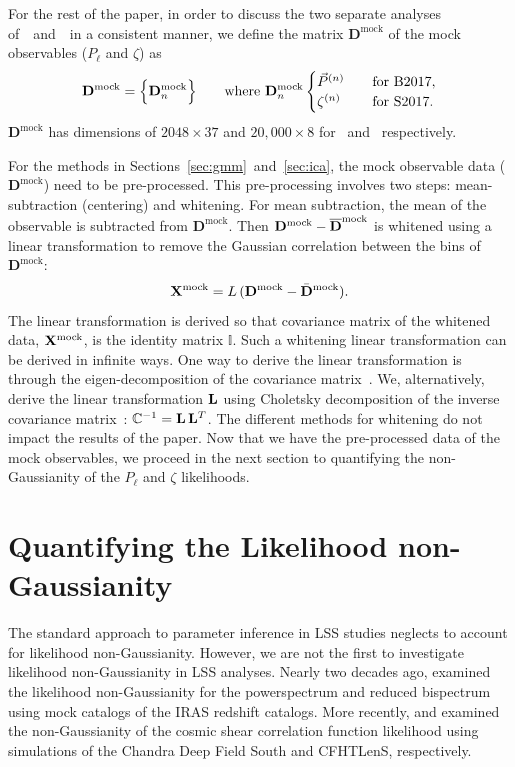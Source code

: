 \documentclass[12pt, letterpaper, preprint]{aastex}
\newcommand{\beq}{\begin{equation}}
\newcommand{\eeq}{\end{equation}}
\newcommand{\Dmock}{\mathbf{D}^\mathrm{mock}}
\newcommand{\Xmock}{{\bf X}^\mathrm{mock}}
\newcommand{\Beut}{\citetalias{beutler2017}}
\newcommand{\Sinh}{\citetalias{sinha2017}}
\begin{document}
For the rest of the paper, in order to discuss the two separate 
analyses of~\Beut~and~\Sinh~in a consistent manner, we define the matrix 
$\Dmock$ of the mock observables ($P_\ell$ and $\zeta$) as 
\beq
\Dmock = \Big\{{\bf D}^\mathrm{mock}_n \Big\} \quad\quad \mathrm{where}\,\,\Dmock_n
\begin{cases}
    \vec{P}^{(n)} &\quad\mathrm{for}\,\, \mathrm{B}2017,\\ 
    \zeta^{(n)} &\quad\mathrm{for}\,\, \mathrm{S}2017.
\end{cases} 
\eeq
$\Dmock$ has dimensions of $2048 \times 37$ and $20,000\times8$ 
for \Beut~and \Sinh~respectively. 

For the methods in Sections~\ref{sec:gmm}~and~\ref{sec:ica}, the mock 
observable data ($\Dmock$) need to be pre-processed. This pre-processing
involves two steps: mean-subtraction (centering) and whitening. For mean subtraction, 
the mean of the observable is subtracted from $\Dmock$. Then 
$\Dmock - \overline{\bf D}^\mathrm{mock}$ is whitened using a linear transformation 
to remove the Gaussian correlation between the bins of $\Dmock$: 
\beq
\Xmock = L\,(\Dmock - \bar{\bf D}^\mathrm{mock}). 
\eeq
The linear transformation is derived so that covariance matrix of the whitened 
data, $\Xmock$, is the identity matrix $\mathbb{I}$. Such a whitening linear 
transformation can be derived in infinite ways. 
One way to derive the linear transformation is through the eigen-decomposition
of the covariance matrix~\citep[\emph{e.g.}][]{hartlap2009, sellentin2017}. We, alternatively, 
derive the linear transformation ${\bf L}$ using Choletsky decomposition of the 
inverse covariance matrix~\citep{Press:1992:NRC:148286}: 
$\mathbb{C}^{-1} = {\bf L}\,{\bf L}^T$. The different methods for whitening 
do not impact the results of the paper. Now that we have the pre-processed 
data of the mock observables, we proceed in the next section to quantifying 
the non-Gaussianity of the $P_\ell$ and $\zeta$ likelihoods. 


\section{Quantifying the Likelihood non-Gaussianity} \label{sec:div}
The standard approach to parameter inference in LSS studies neglects
to account for likelihood non-Gaussianity. 
However, we are not the first to investigate likelihood non-Gaussianity 
in LSS analyses. Nearly two decades ago, \cite{scoccimarro2000} examined 
the likelihood non-Gaussianity for the powerspectrum and reduced bispectrum 
using mock catalogs of the IRAS redshift catalogs. More recently, 
\cite{hartlap2009} and \cite{sellentin2017} examined the non-Gaussianity 
of the cosmic shear correlation function likelihood using simulations of 
the Chandra Deep Field South and CFHTLenS, respectively. 
\end{document}

